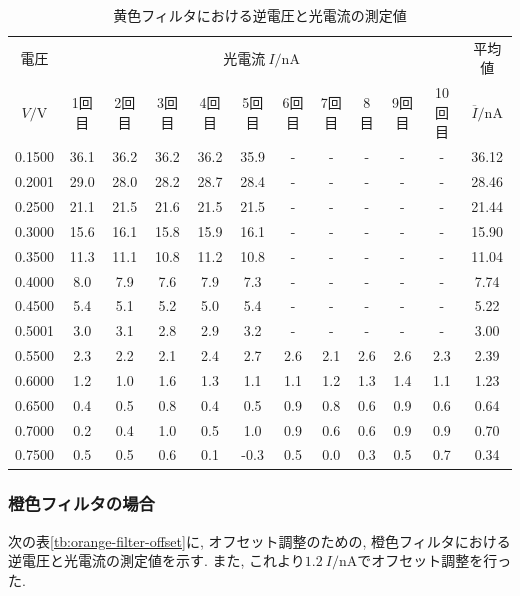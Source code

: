 \documentclass{jarticle}
\begin{document}
\begin{table}[H]
  \caption{黄色フィルタにおける逆電圧と光電流の測定値}
  \label{tb:yellow-filter}
  \hspace{-2.5cm}
  \begin{tabular}{cccccccccccc}
    \hline
    電圧 & \multicolumn{10}{c}{光電流$\ I/\mathrm{nA}$} & 平均値 \\
    $V/\mathrm{V}$ & 1回目 & 2回目 & 3回目 & 4回目 & 5回目 & 6回目 & 7回目 & 8目 & 9回目 & 10回目 & $\overline{I}/\mathrm{nA}$ \\
    \hline
    0.1500 & 36.1 & 36.2 & 36.2 & 36.2 & 35.9 & - & - & - & - & - & 36.12 \\
    0.2001 & 29.0 & 28.0 & 28.2 & 28.7 & 28.4 & - & - & - & - & - & 28.46 \\
    0.2500 & 21.1 & 21.5 & 21.6 & 21.5 & 21.5 & - & - & - & - & - & 21.44 \\
    0.3000 & 15.6 & 16.1 & 15.8 & 15.9 & 16.1 & - & - & - & - & - & 15.90 \\
    0.3500 & 11.3 & 11.1 & 10.8 & 11.2 & 10.8 & - & - & - & - & - & 11.04 \\
    0.4000 & 8.0 & 7.9 & 7.6 & 7.9 & 7.3 & - & - & - & - & - & 7.74 \\
    0.4500 & 5.4 & 5.1 & 5.2 & 5.0 & 5.4 & - & - & - & - & - & 5.22 \\
    0.5001 & 3.0 & 3.1 & 2.8 & 2.9 & 3.2 & - & - & - & - & - & 3.00 \\
    0.5500 & 2.3 & 2.2 & 2.1 & 2.4 & 2.7 & 2.6 & 2.1 & 2.6 & 2.6 & 2.3 & 2.39 \\
    0.6000 & 1.2 & 1.0 & 1.6 & 1.3 & 1.1 & 1.1 & 1.2 & 1.3 & 1.4 & 1.1 & 1.23 \\
    0.6500 & 0.4 & 0.5 & 0.8 & 0.4 & 0.5 & 0.9 & 0.8 & 0.6 & 0.9 & 0.6 & 0.64 \\
    0.7000 & 0.2 & 0.4 & 1.0 & 0.5 & 1.0 & 0.9 & 0.6 & 0.6 & 0.9 & 0.9 & 0.70 \\
    0.7500 & 0.5 & 0.5 & 0.6 & 0.1 & -0.3 & 0.5 & 0.0 & 0.3 & 0.5 & 0.7 & 0.34 \\
    \hline
  \end{tabular}
\end{table}



\subsubsection{橙色フィルタの場合}

次の表\ref{tb:orange-filter-offset}に, オフセット調整のための, 橙色フィルタにおける逆電圧と光電流の測定値を示す.
また, これより$1.2\ I/\mathrm{nA}$でオフセット調整を行った.
\end{document}
